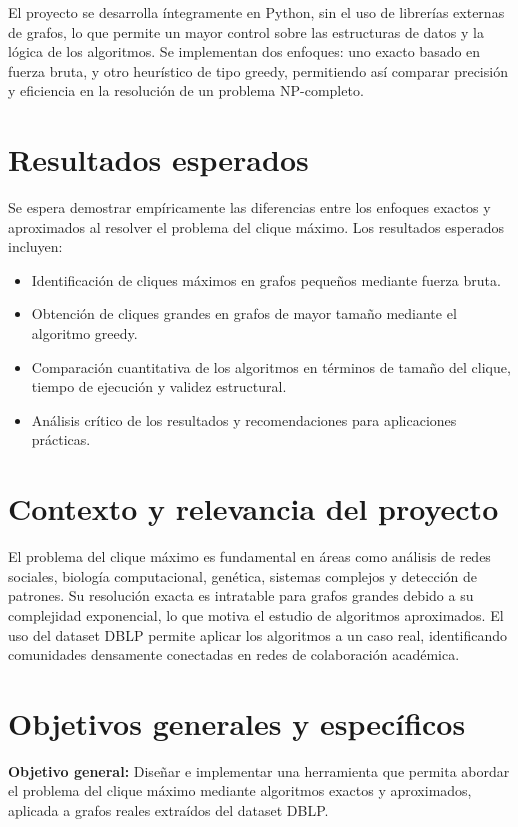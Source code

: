 \documentclass[12pt,a4paper]{report}
\begin{document}
El proyecto se desarrolla íntegramente en Python, sin el uso de librerías externas de grafos, lo que permite un mayor control sobre las estructuras de datos y la lógica de los algoritmos. Se implementan dos enfoques: uno exacto basado en fuerza bruta, y otro heurístico de tipo greedy, permitiendo así comparar precisión y eficiencia en la resolución de un problema NP-completo.

\section{Resultados esperados}
Se espera demostrar empíricamente las diferencias entre los enfoques exactos y aproximados al resolver el problema del clique máximo. Los resultados esperados incluyen:
\begin{itemize}
    \item Identificación de cliques máximos en grafos pequeños mediante fuerza bruta.
    \item Obtención de cliques grandes en grafos de mayor tamaño mediante el algoritmo greedy.
    \item Comparación cuantitativa de los algoritmos en términos de tamaño del clique, tiempo de ejecución y validez estructural.
    \item Análisis crítico de los resultados y recomendaciones para aplicaciones prácticas.
\end{itemize}

\section{Contexto y relevancia del proyecto}
El problema del clique máximo es fundamental en áreas como análisis de redes sociales, biología computacional, genética, sistemas complejos y detección de patrones. Su resolución exacta es intratable para grafos grandes debido a su complejidad exponencial, lo que motiva el estudio de algoritmos aproximados. El uso del dataset DBLP permite aplicar los algoritmos a un caso real, identificando comunidades densamente conectadas en redes de colaboración académica.

\section{Objetivos generales y específicos}
\textbf{Objetivo general:}  
Diseñar e implementar una herramienta que permita abordar el problema del clique máximo mediante algoritmos exactos y aproximados, aplicada a grafos reales extraídos del dataset DBLP.
\end{document}
